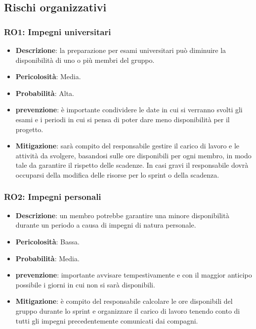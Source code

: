 \subsection{Rischi organizzativi}

\subsubsection{RO1: Impegni universitari}
\begin{itemize}
    \item \textbf{Descrizione}: la preparazione per esami universitari può diminuire la disponibilità di uno o più membri del gruppo.
    \item \textbf{Pericolosità}: Media.
    \item \textbf{Probabilità}: Alta.
    \item \textbf{prevenzione}: è importante condividere le date in cui si verranno svolti gli esami e i periodi in cui si pensa di poter dare meno disponibilità per il progetto.
    \item \textbf{Mitigazione}: sarà compito del responsabile gestire il carico di lavoro e le attività da svolgere, basandosi sulle ore disponibili per ogni membro, in modo tale da garantire il rispetto delle scadenze. 
    In casi gravi il responsabile dovrà occuparsi della modifica delle risorse per lo sprint o della scadenza.
\end{itemize}

\subsubsection{RO2: Impegni personali}
\begin{itemize}
    \item \textbf{Descrizione}: un membro potrebbe garantire una minore disponibilità durante un periodo a causa di impegni di natura personale.
    \item \textbf{Pericolosità}: Bassa.
    \item \textbf{Probabilità}: Media.
    \item \textbf{prevenzione}: importante avvisare tempestivamente e con il maggior anticipo possibile i giorni in cui non si sarà disponibili. 
    \item \textbf{Mitigazione}: è compito del responsabile calcolare le ore disponibili del gruppo durante lo sprint e organizzare il carico di lavoro tenendo conto di tutti gli impegni precedentemente comunicati dai compagni. 
\end{itemize}

